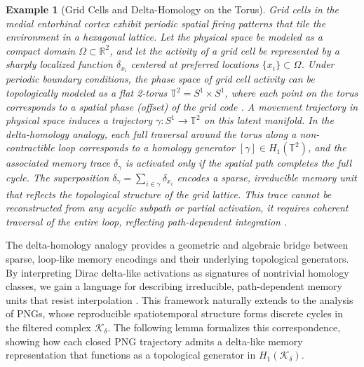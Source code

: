 \documentclass[lettersize,journal]{IEEEtran}
\newtheorem{example}{Example}
\begin{document}
\begin{example}[Grid Cells and Delta-Homology on the Torus]
Grid cells in the medial entorhinal cortex exhibit periodic spatial firing patterns that tile the environment in a hexagonal lattice. Let the physical space be modeled as a compact domain \( \Omega \subset \mathbb{R}^2 \), and let the activity of a grid cell be represented by a sharply localized function \( \delta_{x_i} \) centered at preferred locations \( \{x_i\} \subset \Omega \).
Under periodic boundary conditions, the phase space of grid cell activity can be topologically modeled as a flat 2-torus \( \mathbb{T}^2 = S^1 \times S^1 \), where each point on the torus corresponds to a spatial phase (offset) of the grid code \cite{stemmler2015connecting}. A movement trajectory in physical space induces a trajectory \( \gamma: S^1 \to \mathbb{T}^2 \) on this latent manifold.
In the delta-homology analogy, each full traversal around the torus along a non-contractible loop corresponds to a homology generator \( [\gamma] \in H_1(\mathbb{T}^2) \), and the associated memory trace \( \delta_\gamma \) is activated only if the spatial path completes the full cycle. The superposition
$\delta_\gamma = \sum_{i \in \gamma} \delta_{x_i}$
encodes a sparse, irreducible memory unit that reflects the topological structure of the grid lattice. This trace cannot be reconstructed from any acyclic subpath or partial activation, it requires coherent traversal of the entire loop, reflecting path-dependent integration \cite{mcnaughton2006path}.
\end{example}


The delta-homology analogy provides a geometric and algebraic bridge between sparse, loop-like memory encodings and their underlying topological generators. By interpreting Dirac delta-like activations as signatures of nontrivial homology classes, we gain a language for describing irreducible, path-dependent memory units that resist interpolation \cite{rosiak2022sheaf}. This framework naturally extends to the analysis of PNGs, whose reproducible spatiotemporal structure forms discrete cycles in the filtered complex \( \mathcal{K}_\delta \). The following lemma formalizes this correspondence, showing how each closed PNG trajectory admits a delta-like memory representation that functions as a topological generator in \( H_1(\mathcal{K}_\delta) \).
\end{document}
